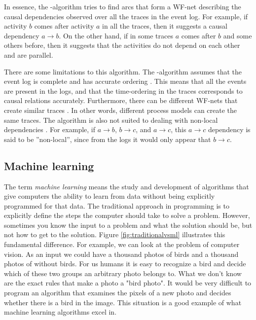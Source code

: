In essence, the \textalpha-algorithm tries to find arcs that form a WF-net describing the causal dependencies observed over all the traces in the event log. 
For example, if activity $b$ comes after activity $a$ in all the traces, then it suggests a causal dependency $a \rightarrow b$.
On the other hand, if in some traces $a$ comes after $b$ and some others before, then it suggests that the activities do not depend on each other and are parallel.

There are some limitations to this algorithm.
The \textalpha-algorithm assumes that the event log is complete and has accurate ordering \cite{van2013discovering}. This means that all the events are present in the logs, and that the time-ordering in the traces corresponds to causal relations accurately. Furthermore, there can be different WF-nets that create similar traces \cite{van2013discovering}. In other words, different process models can create the same traces.
The algorithm is also not suited to dealing with non-local dependencies \cite{van2013discovering}.
For example, if $a \rightarrow b$, $b \rightarrow c$, and $a \rightarrow c$, this $a \rightarrow c$ dependency is said to be ''non-local'', since from the logs it would only appear that $b \rightarrow c$. 


\subsection{Machine learning}

The term \textit{machine learning} means the study and development of algorithms that give computers the ability to learn from data without being explicitly programmed for that data. 
The traditional approach in programming is to explicitly define the steps the computer should take to solve a problem.
However, sometimes you know the input to a problem and what the solution should be, but not how to get to the solution.
Figure \ref{fig:traditionalvsml} illustrates this fundamental difference.
For example, we can look at the problem of computer vision.
As an input we could have a thousand photos of birds and a thousand photos of without birds.
For us humans it is easy to recognize a bird and decide which of these two groups an arbitrary photo belongs to.
What we don't know are the exact rules that make a photo a "bird photo".
It would be very difficult to program an algorithm that examines the pixels of a new photo and decides whether there is a bird in the image.
This situation is a good example of what machine learning algorithms excel in.

